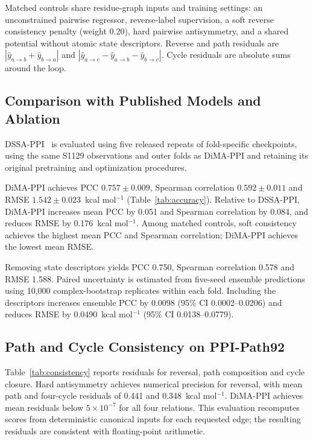 Matched controls share residue-graph inputs and training settings: an
unconstrained pairwise regressor, reverse-label supervision, a soft reverse
consistency penalty (weight 0.20), hard pairwise antisymmetry, and a shared
potential without atomic state descriptors. Reverse and path residuals are
$|\widehat y_{a\to b}+\widehat y_{b\to a}|$ and
$|\widehat y_{a\to c}-\widehat y_{a\to b}-\widehat y_{b\to c}|$.
Cycle residuals are absolute sums around the loop.

\subsection{Comparison with Published Models and Ablation}

DSSA-PPI~\cite{dssappi} is evaluated using five released repeats of
fold-specific checkpoints, using the same S1129 observations and outer
folds as DiMA-PPI and retaining its original pretraining and optimization
procedures.

DiMA-PPI achieves PCC $0.757\pm0.009$, Spearman correlation
$0.592\pm0.011$ and RMSE $1.542\pm0.023$~kcal mol$^{-1}$
(Table~\ref{tab:accuracy}). Relative to DSSA-PPI, DiMA-PPI increases
mean PCC by 0.051 and Spearman correlation by 0.084, and reduces RMSE by
0.176~kcal mol$^{-1}$. Among matched controls, soft consistency achieves the highest mean
PCC and Spearman correlation; DiMA-PPI achieves the lowest mean RMSE.

Removing state descriptors yields PCC 0.750, Spearman correlation 0.578
and RMSE 1.588. Paired uncertainty is estimated from five-seed ensemble
predictions using 10,000 complex-bootstrap replicates within each fold.
Including the descriptors increases ensemble PCC by 0.0098 (95\% CI 0.0002--0.0206) and reduces
RMSE by 0.0490~kcal mol$^{-1}$ (95\% CI 0.0138--0.0779).

\subsection{Path and Cycle Consistency on PPI-Path92}

Table~\ref{tab:consistency} reports residuals for reversal, path composition
and cycle closure. Hard antisymmetry achieves numerical precision for
reversal, with mean path and four-cycle residuals of 0.441 and
0.348~kcal mol$^{-1}$. DiMA-PPI achieves mean residuals below
$5\times10^{-7}$ for all four relations. This evaluation recomputes scores
from deterministic canonical inputs for each requested edge; the resulting
residuals are consistent with floating-point arithmetic.

